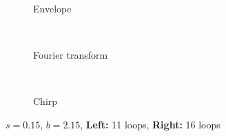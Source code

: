 
%
%


\begin{figure}[p]
\centering
\begin{subfigure}{\textwidth}
\centering
%

\caption{Envelope}
\end{subfigure} \\
\begin{subfigure}{\textwidth}
\centering
%

\caption{Fourier transform}
\end{subfigure} \\
\begin{subfigure}{\textwidth}
\centering
%

\caption{Chirp}
\end{subfigure}
\caption[Envelope, Fourier transform, and chirp of the pulse---unstable case.]{$s = 0.15$, $b = 2.15$, \textbf{Left:} 11 loops, \textbf{Right:} 16 loops}
\label{fig:break}
\end{figure}

